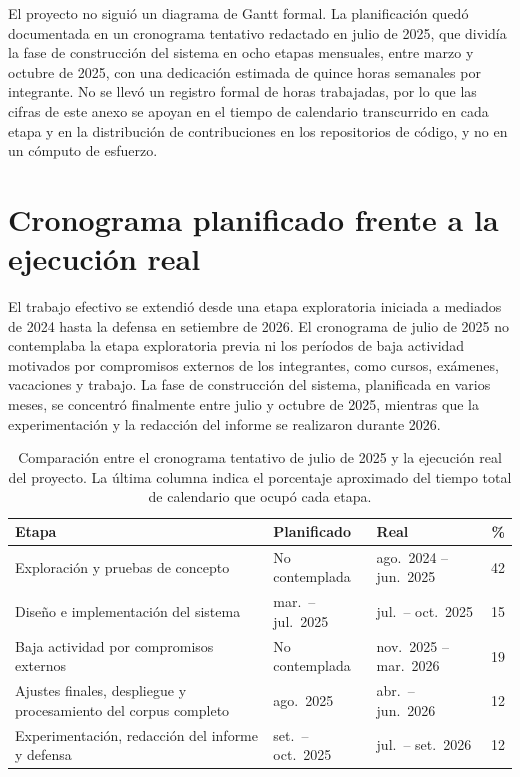 \label{chapter:A-Planificacion}

El proyecto no siguió un diagrama de Gantt formal. La planificación quedó documentada en un cronograma tentativo redactado en julio de 2025, que dividía la fase de construcción del sistema en ocho etapas mensuales, entre marzo y octubre de 2025, con una dedicación estimada de quince horas semanales por integrante. No se llevó un registro formal de horas trabajadas, por lo que las cifras de este anexo se apoyan en el tiempo de calendario transcurrido en cada etapa y en la distribución de contribuciones en los repositorios de código, y no en un cómputo de esfuerzo.

\section{Cronograma planificado frente a la ejecución real}

El trabajo efectivo se extendió desde una etapa exploratoria iniciada a mediados de 2024 hasta la defensa en setiembre de 2026. El cronograma de julio de 2025 no contemplaba la etapa exploratoria previa ni los períodos de baja actividad motivados por compromisos externos de los integrantes, como cursos, exámenes, vacaciones y trabajo. La fase de construcción del sistema, planificada en varios meses, se concentró finalmente entre julio y octubre de 2025, mientras que la experimentación y la redacción del informe se realizaron durante 2026.

\begin{table}[htbp]
    \centering
    {\small\setlength{\tabcolsep}{4pt}
    \begin{tabular}{@{}p{4.0cm}p{2.6cm}p{2.6cm}r@{}}
        \toprule
        \textbf{Etapa} & \textbf{Planificado} & \textbf{Real} & \textbf{\%} \\
        \midrule
        Exploración y pruebas de concepto & No contemplada & ago.\ 2024 -- jun.\ 2025 & 42 \\
        Diseño e implementación del sistema & mar.\ -- jul.\ 2025 & jul.\ -- oct.\ 2025 & 15 \\
        Baja actividad por compromisos externos & No contemplada & nov.\ 2025 -- mar.\ 2026 & 19 \\
        Ajustes finales, despliegue y procesamiento del corpus completo & ago.\ 2025 & abr.\ -- jun.\ 2026 & 12 \\
        Experimentación, redacción del informe y defensa & set.\ -- oct.\ 2025 & jul.\ -- set.\ 2026 & 12 \\
        \bottomrule
    \end{tabular}}
    \caption{Comparación entre el cronograma tentativo de julio de 2025 y la ejecución real del proyecto. La última columna indica el porcentaje aproximado del tiempo total de calendario que ocupó cada etapa.}
    \label{tab:planificacion-cronograma}
\end{table}

